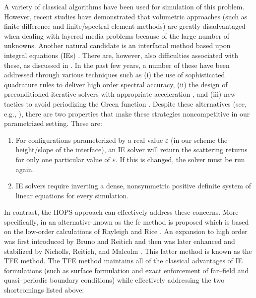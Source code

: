 A variety of classical algorithms have been used for simulation of this problem. However, recent studies have demonstrated \cite{AmbroseNicholls13,Nicholls14b,nicholls2016high,NichollsOhJohnsonReitich15} that volumetric approaches (such as finite difference and finite/spectral element methods) are greatly disadvantaged when dealing with layered media problems because of
the large number of unknowns. Another natural candidate is an interfacial method based upon integral equations (IEs) \cite{ColtonKress13}. There are, however, also difficulties associated with these, as discussed in \cite{AmbroseNicholls13,Nicholls14b,nicholls2016high,NichollsOhJohnsonReitich15}. In the past few years, a number of these have been addressed through various techniques such as (i) the use of sophisticated quadrature rules to deliver high order spectral accuracy, (ii) the design of preconditioned iterative solvers with appropriate acceleration \cite{GreengardRokhlin87}, and (iii) new tactics to avoid periodizing the Green function \cite{BarnettGreengard11,ChoBarnett15,LaiKobayashiBarnett15}. Despite these alternatives (see, e.g., \cite{ReitichTamma04}), there are two properties that make these strategies noncompetitive in our parametrized setting.  These are:
\begin{enumerate}
    \item For configurations parameterized by a real value $\varepsilon$ (in our scheme the height/slope of the interface), an IE solver will return the scattering returns for only one particular value of $\varepsilon$. If this is changed, the solver must be run again.
    \item IE solvers require inverting a dense, nonsymmetric positive definite system of linear equations for every simulation.
\end{enumerate}
In contrast, the HOPS approach \cite{Nicholls14b,nicholls2016high,NichollsOhJohnsonReitich15} can effectively address these concerns. More specifically, in \cite{nicholls2016high,NichollsOhJohnsonReitich15} an alternative known as the \gls{fe} method is proposed which is based on the low-order calculations of Rayleigh \cite{Rayleigh07} and Rice \cite{Rice51}. An expansion to high order was first introduced by Bruno and Reitich \cite{BrunoReitich93a,BrunoReitich93b,BrunoReitich93c} and then was later enhanced and stabilized by Nicholls, Reitich, and Malcolm \cite{NichollsReitich03a,NichollsReitich03b,NichollsReitich07,MalcolmNicholls10}. This latter method is known as the TFE method. The TFE method maintains all of the classical advantages of IE formulations (such as surface formulation and exact enforcement of far--field and quasi--periodic boundary conditions) while effectively addressing the two shortcomings listed above:
